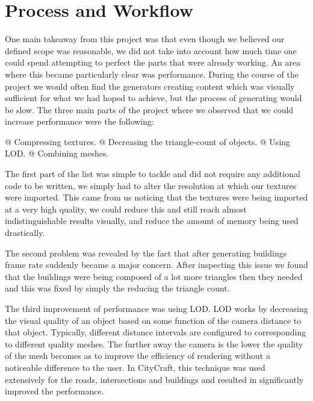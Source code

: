 \section{Process and Workflow}

One main takeaway from this project was that even though we believed our defined scope was reasonable, we did not take into account how much time one could spend attempting to perfect the parts that were already working.
An area where this became particularly clear was performance.
During the course of the project we would often find the generators creating content which was visually sufficient for what we had hoped to achieve, but the process of generating would be slow. 
The three main parts of the project where we observed that we could increase performance were the following:

\begin{easylist}
  @ Compressing textures.
  @ Decreasing the triangle-count of objects.
  @ Using LOD.
  @ Combining meshes. 
 \end{easylist}
 
The first part of the list was simple to tackle and did not require any additional code to be written, we simply had to alter the resolution at which our textures were imported.
This came from us noticing that the textures were being imported at a very high quality, we could reduce this and still reach almost indistinguishable results visually, and reduce the amount of memory being used drastically. 

The second problem was revealed by the fact that after generating buildings frame rate suddenly became a major concern. 
After inspecting this issue we found that the buildings were being composed of a lot more triangles then they needed and this was fixed by simply the reducing the triangle count. 

The third improvement of performance was using LOD.
LOD works by decreasing the visual quality of an object based on some function of the camera distance to that object.
Typically, different distance intervals are configured to corresponding to different quality meshes.
The further away the camera is the lower the quality of the mesh becomes as to improve the efficiency of rendering without a noticeable difference to the user.
In CityCraft, this technique was used extensively for the roads, intersections and buildings and resulted in significantly improved the performance.

